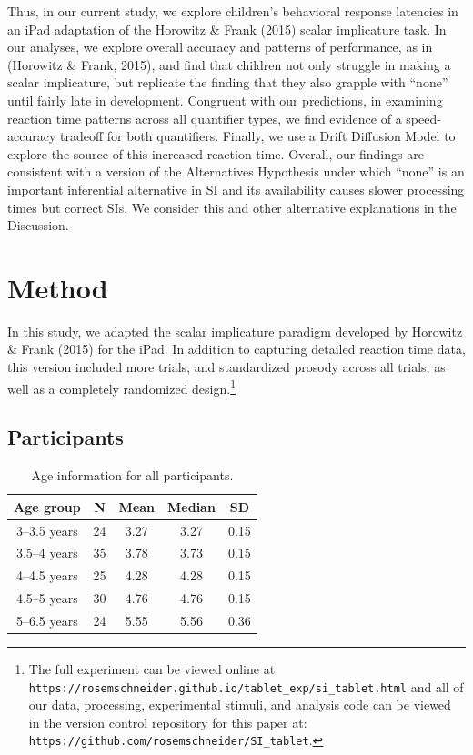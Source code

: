 \documentclass[10pt, letterpaper]{article}
\begin{document}
Thus, in our current study, we explore children's behavioral response
latencies in an iPad adaptation of the Horowitz \& Frank (2015) scalar
implicature task. In our analyses, we explore overall accuracy and
patterns of performance, as in (Horowitz \& Frank, 2015), and find that
children not only struggle in making a scalar implicature, but replicate
the finding that they also grapple with ``none'' until fairly late in
development. Congruent with our predictions, in examining reaction time
patterns across all quantifier types, we find evidence of a
speed-accuracy tradeoff for both quantifiers. Finally, we use a Drift
Diffusion Model to explore the source of this increased reaction time.
Overall, our findings are consistent with a version of the Alternatives
Hypothesis under which ``none'' is an important inferential alternative
in SI and its availability causes slower processing times but correct
SIs. We consider this and other alternative explanations in the
Discussion.

\section{Method}\label{method}

In this study, we adapted the scalar implicature paradigm developed by
Horowitz \& Frank (2015) for the iPad. In addition to capturing detailed
reaction time data, this version included more trials, and standardized
prosody across all trials, as well as a completely randomized
design.\footnote{The full experiment can be viewed online at \texttt{https://rosemschneider.github.io/tablet\_exp/si\_tablet.html} and all of our data, processing, experimental stimuli, and analysis code can be viewed in the version control repository for this paper at: \texttt{https://github.com/rosemschneider/SI\_tablet}.}

\subsection{Participants}\label{participants}

\begin{table}[t]
\centering
\begin{tabular}{c c c c c } 
 \hline
 Age group & N & Mean & Median & SD \\
 \hline
 3--3.5 years & 24 & 3.27 & 3.27 & 0.15\\
 3.5--4 years & 35 & 3.78 & 3.73 & 0.15 \\ 
 4--4.5 years & 25 & 4.28 & 4.28 & 0.15\\
 4.5--5 years & 30 & 4.76 & 4.76 & 0.15 \\
 5--6.5 years & 24 & 5.55 & 5.56 & 0.36 \\
 \hline
\end{tabular}
\caption{Age information for all participants.}
\label{tab:age}
\end{table}
\end{document}

